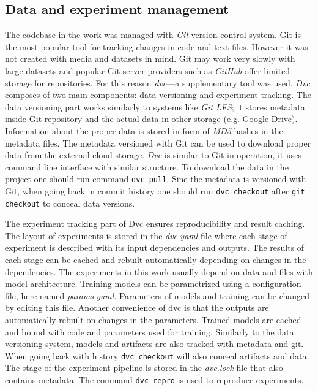 \subsection{Data and experiment management}
The codebase in the work was managed with \textit{Git} version control system.
Git is the most popular tool for tracking changes in code and text files.
However it was not created with media and datasets in mind.
Git may work very slowly with large datasets and popular Git server providers such as \textit{GitHub} offer limited storage for repositories.
For this reason \textit{dvc}---a supplementary tool was used.
\textit{Dvc} composes of two main components: data versioning and experiment tracking.
The data versioning part works similarly to systems like \textit{Git LFS}; it stores metadata inside Git repository and the actual data in other storage (e.g. Google Drive).
Information about the proper data is stored in form of \textit{MD5} hashes in the metadata files.
The metadata versioned with Git can be used to download proper data from the external cloud storage.
\textit{Dvc} is similar to Git in operation, it uses command line interface with similar structure.
To download the data in the project one should run command \texttt{dvc pull}.
Sine the metadata is versioned with Git, when going back in commit history one should run \texttt{dvc checkout} after \texttt{git checkout} to conceal data versions.

The experiment tracking part of Dvc ensures reproducibility and result caching.
The layout of experiments is stored in the \textit{dvc.yaml} file where each stage of experiment is described with its input dependencies and outputs.
The results of each stage can be cached and rebuilt automatically depending on changes in the dependencies.
The experiments in this work usually depend on data and files with model architecture.
Training models can be parametrized using a configuration file, here named \textit{params.yaml}.
Parameters of models and training can be changed by editing this file.
Another convenience of dvc is that the outputs are automatically rebuilt on changes in the parameters.
Trained models are cached and bound with code and parameters used for training.
Similarly to the data versioning system, models and artifacts are also tracked with metadata and git.
When going back with history \texttt{dvc checkout} will also conceal artifacts and data.
The stage of the experiment pipeline is stored in the \textit{dvc.lock} file that also contains metadata.
The command \texttt{dvc repro} is used to reproduce experiments.

